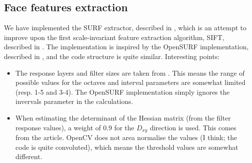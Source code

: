 \subsection{Face features extraction}
We have implemented the SURF extractor, described in \cite{SURF},
which is an attempt to improve upon the first scale-invariant feature
extraction algorithm, SIFT, described in \cite{SIFT}. The
implementation is inspired by the OpenSURF implementation, described
in \cite{OpenSURF}, and the code structure is quite similar.
Interesting points:

\begin{itemize}
\item The response layers and filter sizes are taken from \cite{SURF}.
  This means the range of possible values for the octaves and interval
  parameters are somewhat limited (resp. 1-5 and 3-4). The OpenSURF
  implementation simply ignores the invervals parameter in the
  calculations.
\item When estimating the determinant of the Hessian matrix (from the
  filter response values), a weight of $0.9$ for the $D_{xy}$
  direction is used. This comes from the article. OpenCV does not area
  normalise the values (I think; the code is quite convoluted), which
  means the threshold values are somewhat different.
\end{itemize}
